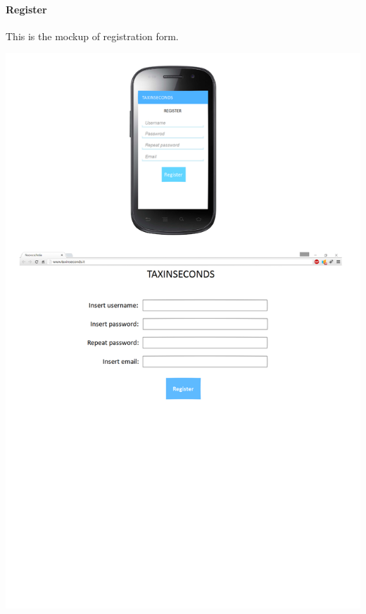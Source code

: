 \documentclass{article}
\begin{document}
\paragraph{Register}
This is the mockup of registration form.\\
\begin{center}
	\includegraphics[width=.9\textwidth,height=.9\textheight,keepaspectratio]{RegisterInterface}
\end{center}
\clearpage
\end{document}
